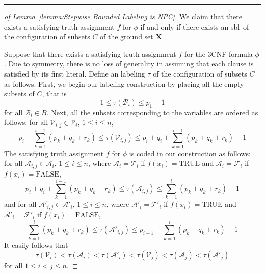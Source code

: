 \documentclass[a4paper,10pt]{llncs}
\newcommand{\SBL}{sbl}
\newcommand{\horiz}{{\centering\rule{350pt}{.4pt}}}
\begin{document}
\horiz

\begin{proof}[of Lemma~\ref{lemma:Stepwise Bounded Labeling is NPC}]
We claim that there exists a satisfying truth assignment $f$ for
$\phi$ if and only if there exists an \SBL\ of the configuration of subsets $C$ of the ground set $\mathbf{X}$.

  Suppose that there exists a satisfying truth assignment $f$ for the 
  $3$CNF formula $\phi$. 
  Due to symmetry, there is no loss of generality in assuming that each clause is 
  satisfied by its first literal. 
  Define an labeling $\tau$ of the configuration of subsets $C$ as follows. 
  First, we begin our labeling construction by placing all the empty subsets of $C$, that is
  $$
  1 \leq \tau(\mathcal{B}_i) \leq p_1 - 1
  $$
  for all $\mathcal{B}_i \in B$. 
  Next, all the subsets corresponding to the variables are ordered as follows: 
  for all $\mathcal{V}_{i, j} \in \mathcal{V}_{i}$, $1 \leq i \leq n$,
  $$
  p_i + \sum_{k = 1}^{i-1} (p_k + q_k + r_k) \leq \tau(\mathcal{V}_{i, j}) \leq p_i + q_i + \sum_{k = 1}^{i-1} (p_k + q_k + r_k) - 1
  $$
  The satisfying truth assignment $f$ for $\phi$ is coded in our construction as follows: 
  for all $\mathcal{A}_{i, j} \in \mathcal{A}_i$, $1 \leq i \leq n$, 
  where $\mathcal{A}_i = \mathcal{T}_i$ if $f(x_i) = \mbox{TRUE}$ and 
  $\mathcal{A}_i = \mathcal{F}_i$ if $f(x_i) = \mbox{FALSE}$,
  $$
  p_i + q_i + \sum_{k = 1}^{i-1} (p_k + q_k + r_k) \leq \tau(\mathcal{A}_{i, j}) \leq \sum_{k = 1}^{i} (p_k + q_k + r_k) - 1
  $$
  and for all $\mathcal{A}'_{i, j} \in \mathcal{A}'_i$, $1 \leq i \leq n$, 
  where $\mathcal{A}'_i = \mathcal{T}'_i$ if $f(x_i) = \mbox{TRUE}$ and $\mathcal{A}'_i = \mathcal{F}'_i$ if $f(x_i) = \mbox{FALSE}$,
  $$
  \sum_{k = 1}^{i} (p_k + q_k + r_k) \leq \tau(\mathcal{A}'_{i, j}) \leq p_{i+1} + \sum_{k = 1}^{i} (p_k + q_k + r_k) - 1
  $$
  It easily follows that
  $$
  \tau(\mathcal{V}_i) < \tau(\mathcal{A}_i) < \tau(\mathcal{A}'_i) < \tau(\mathcal{V}_j) < \tau(\mathcal{A}_j) < \tau(\mathcal{A}'_j)
  $$
  for all $1 \leq i < j \leq n$.


\end{proof}
\end{document}
